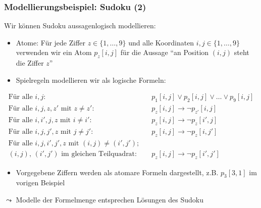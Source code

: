 \documentclass[aspectratio=1610,onlymath]{beamer}
\let\beameroriginaldoublebackslash\\
\let\\=\beameroriginaldoublebackslash
\begin{document}
\begin{frame}\frametitle{Modellierungsbeispiel: Sudoku (2)}

Wir können Sudoku aussagenlogisch modellieren:\pause

\begin{itemize}
\item \alert{Atome:} Für jede Ziffer $z\in\{1,\ldots,9\}$ und alle Koordinaten $i,j\in\{1,\ldots,9\}$ verwenden wir ein Atom $p_z[i,j]$ für die Aussage "`an Position $(i,j)$ steht die Ziffer $z$"'
\pause
\item \alert{Spielregeln} modellieren wir als logische Formeln:
\end{itemize}\vspace{-2.5ex}
\begin{align*}
\text{Für alle $i,j$:} & \quad p_1[i,j]\vee p_2[i,j]\vee\ldots\vee p_9[i,j] %
\\
\text{Für alle $i,j,z,z'$ mit $z\neq z'$:} & \quad p_z[i,j] \to \neg p_{z'}[i,j] %
\\
\text{Für alle $i,i',j,z$ mit $i\neq i'$:} & \quad p_z[i,j] \to \neg p_z[i',j] %
\\
\text{Für alle $i,j,j',z$ mit $j\neq j'$:} & \quad p_z[i,j] \to \neg p_z[i,j'] %
\\
\text{Für alle $i,j,i',j',z$ mit $(i,j)\neq (i',j')$;}\\
\text{$(i,j)$, $(i',j')$  im gleichen Teilquadrat:} & \quad p_z[i,j] \to \neg p_z[i',j'] %
\end{align*}\vspace{-4ex}\pause
\begin{itemize}
\item \alert{Vorgegebene Ziffern} werden als atomare Formeln dargestellt, z.B. $p_3[3,1]$ im vorigen Beispiel
\end{itemize}\pause
$\leadsto$ Modelle der Formelmenge entsprechen Lösungen des Sudoku

\end{frame}
\end{document}
